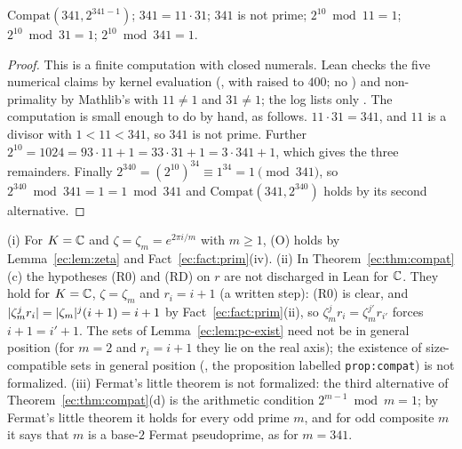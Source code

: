 \begin{proposition}[$m=341$; computer-assisted in Lean; written proof by hand; \leanref{PCompat.ex341}{PRIMEFOLD/compat/lean/PCompatCore.lean:277}]\label{ec:prop:ex341}
$\mathrm{Compat}(341,2^{341-1})$; $341=11\cdot31$; $341$ is not prime; $2^{10}\bmod11=1$; $2^{10}\bmod31=1$;
$2^{10}\bmod341=1$.
\end{proposition}

\begin{proof}
This is a finite computation with closed numerals. Lean checks the five numerical claims by kernel evaluation
(, with  raised to $400$; no ) and non-primality by
Mathlib's  with $11\ne1$ and $31\ne1$; the log lists only . The computation is
small enough to do by hand, as follows. $11\cdot31=341$, and $11$ is a divisor with
$1<11<341$, so $341$ is not prime. Further $2^{10}=1024=93\cdot11+1=33\cdot31+1=3\cdot341+1$, which gives the three
remainders. Finally $2^{340}=(2^{10})^{34}\equiv1^{34}=1\pmod{341}$, so $2^{340}\bmod341=1=1\bmod341$ and
$\mathrm{Compat}(341,2^{340})$ holds by its second alternative.
\end{proof}

\begin{remark}\label{ec:rem:compat}
(i) For $K=\mathbb C$ and $\zeta=\zeta_m=e^{2\pi i/m}$ with $m\ge1$, (O) holds by Lemma~\ref{ec:lem:zeta} and
Fact~\ref{ec:fact:prim}(iv). (ii) In Theorem~\ref{ec:thm:compat}(c) the hypotheses (R0) and (RD) on $r$ are not
discharged in Lean for $\mathbb C$. They hold for $K=\mathbb C$, $\zeta=\zeta_m$ and $r_i=i+1$ (a written step): (R0) is clear, and
$\lvert\zeta_m^jr_i\rvert=\lvert\zeta_m\rvert^j(i+1)=i+1$ by Fact~\ref{ec:fact:prim}(ii), so $\zeta_m^jr_i=\zeta_m^{j'}r_{i'}$ forces
$i+1=i'+1$. The sets of Lemma~\ref{ec:lem:pc-exist} need not be in general position (for $m=2$ and $r_i=i+1$ they lie
on the real axis); the existence of size-compatible sets in general position
(, the proposition labelled \texttt{prop:compat}) is not formalized.
(iii) Fermat's little theorem is not formalized: the third alternative of Theorem~\ref{ec:thm:compat}(d) is the
arithmetic condition $2^{m-1}\bmod m=1$; by Fermat's little theorem it holds for every odd prime $m$, and for odd
composite $m$ it says that $m$ is a base-$2$ Fermat pseudoprime, as for $m=341$.
\end{remark}


